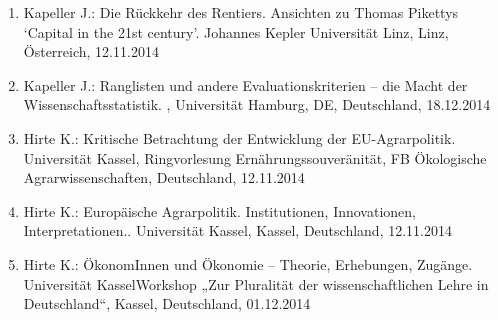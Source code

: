 \begin{enumerate}
	\item Kapeller J.: Die Rückkehr des Rentiers. Ansichten zu Thomas Pikettys ‘Capital in the 21st century’. Johannes Kepler Universität Linz, Linz, Österreich, 12.11.2014
	\item Kapeller J.: Ranglisten und andere Evaluationskriterien – die Macht der Wissenschaftsstatistik. , Universität Hamburg, DE, Deutschland, 18.12.2014
	\item Hirte K.: Kritische Betrachtung der Entwicklung der EU-Agrarpolitik. Universität Kassel, Ringvorlesung Ernährungssouveränität, FB Ökologische Agrarwissenschaften, Deutschland, 12.11.2014
	\item Hirte K.: Europäische Agrarpolitik. Institutionen, Innovationen, Interpretationen.. Universität Kassel, Kassel, Deutschland, 12.11.2014
	\item Hirte K.: ÖkonomInnen und Ökonomie – Theorie, Erhebungen, Zugänge. Universität KasselWorkshop „Zur Pluralität der wissenschaftlichen Lehre in Deutschland“, Kassel, Deutschland, 01.12.2014
\end{enumerate}
